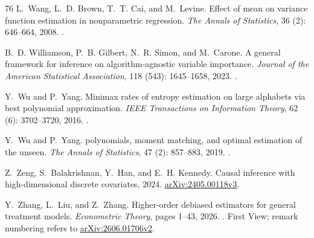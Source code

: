 \documentclass[12pt,oneside,openany]{book}
\numberwithin{equation}{chapter}
\theoremstyle{plain}
\theoremstyle{definition}
\theoremstyle{remark}
\begin{document}
\begin{thebibliography}{76}
L.~Wang, L.~D. Brown, T.~T. Cai, and M.~Levine.
\newblock Effect of mean on variance function estimation in nonparametric
  regression.
\newblock \emph{The Annals of Statistics}, 36 (2): 646--664,
  2008.
\newblock {}.

B.~D. Williamson, P.~B. Gilbert, N.~R. Simon, and M.~Carone.
\newblock A general framework for inference on algorithm-agnostic variable
  importance.
\newblock \emph{Journal of the American Statistical Association}, 118
  (543): 1645--1658, 2023.
\newblock {}.

Y.~Wu and P.~Yang.
\newblock Minimax rates of entropy estimation on large alphabets via best
  polynomial approximation.
\newblock \emph{IEEE Transactions on Information Theory}, 62
  (6): 3702--3720, 2016.
\newblock {}.

Y.~Wu and P.~Yang.
 polynomials, moment matching, and optimal estimation of
  the unseen.
\newblock \emph{The Annals of Statistics}, 47 (2): 857--883,
  2019.
\newblock {}.

Z.~Zeng, S.~Balakrishnan, Y.~Han, and E.~H. Kennedy.
\newblock Causal inference with high-dimensional discrete covariates, 2024.
\newblock \href{https://arxiv.org/abs/2405.00118v3}{arXiv:2405.00118v3}.

Y.~Zhang, L.~Liu, and Z.~Zhang.
\newblock Higher-order debiased estimators for general treatment models.
\newblock \emph{Econometric Theory}, pages 1--43, 2026.
\newblock {}.
\newblock First View; remark numbering refers to
  \href{https://arxiv.org/abs/2606.01706v2}{arXiv:2606.01706v2}.

\end{thebibliography}
\end{document}
